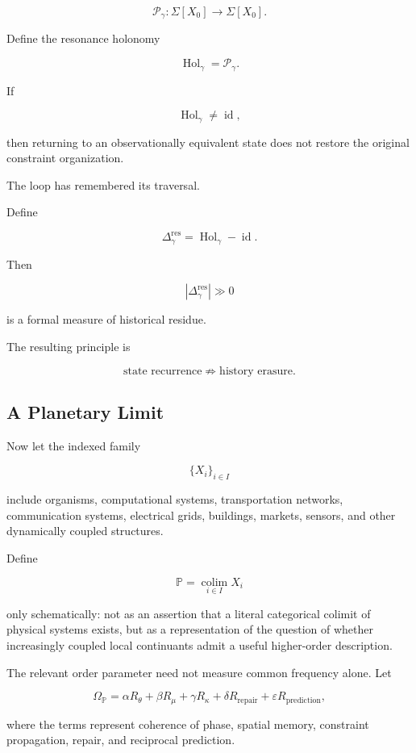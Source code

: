 \documentclass[11pt]{article}
\begin{document}
\[
\mathcal{P}_{\gamma}
:
\Sigma[X_0]
\rightarrow
\Sigma[X_0].
\]

Define the resonance holonomy

\[
\operatorname{Hol}_{\gamma}
=
\mathcal{P}_{\gamma}.
\]

If

\[
\operatorname{Hol}_{\gamma}
\neq
\operatorname{id},
\]

then returning to an observationally equivalent state does not restore the original constraint organization.

The loop has remembered its traversal.

Define

\[
\Delta_{\gamma}^{\mathrm{res}}
=
\operatorname{Hol}_{\gamma}
-
\operatorname{id}.
\]

Then

\[
\left|
\Delta_{\gamma}^{\mathrm{res}}
\right|
\gg 0
\]

is a formal measure of historical residue.

The resulting principle is

\[
\boxed{
\text{state recurrence}
\not\Rightarrow
\text{history erasure}.
}
\]

\subsection{A Planetary Limit}

Now let the indexed family

\[
\{X_i\}_{i\in I}
\]

include organisms, computational systems, transportation networks, communication systems, electrical grids, buildings, markets, sensors, and other dynamically coupled structures.

Define

\[
\mathbb{P}
=
\operatorname*{colim}_{i\in I}
X_i
\]

only schematically: not as an assertion that a literal categorical colimit of physical systems exists, but as a representation of the question of whether increasingly coupled local continuants admit a useful higher-order description.

The relevant order parameter need not measure common frequency alone. Let

\[
\Omega_{\mathbb{P}}
=
\alpha R_{\theta}
+
\beta R_{\mu}
+
\gamma R_{\kappa}
+
\delta R_{\mathrm{repair}}
+
\varepsilon R_{\mathrm{prediction}},
\]

where the terms represent coherence of phase, spatial memory, constraint propagation, repair, and reciprocal prediction.
\end{document}
